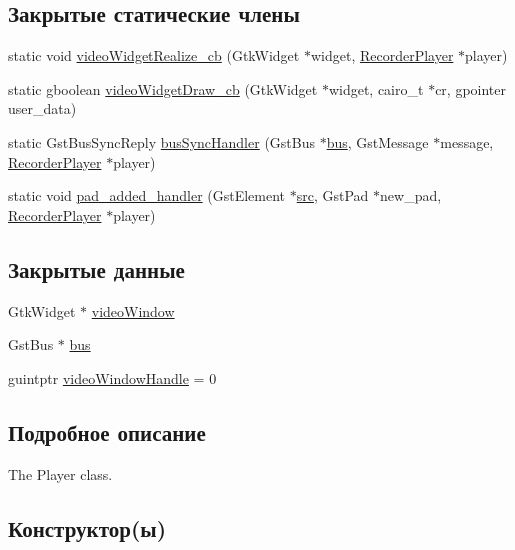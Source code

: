 \subsection*{Закрытые статические члены}
\begin{DoxyCompactItemize}
\item 
static void \hyperlink{class_recorder_player_adac1a9507b04011782c05557220ef7f2}{video\+Widget\+Realize\+\_\+cb} (Gtk\+Widget $\ast$widget, \hyperlink{class_recorder_player}{Recorder\+Player} $\ast$player)
\item 
static gboolean \hyperlink{class_recorder_player_ad1bf2b3712c21b8d5c24f01b23a5c854}{video\+Widget\+Draw\+\_\+cb} (Gtk\+Widget $\ast$widget, cairo\+\_\+t $\ast$cr, gpointer user\+\_\+data)
\item 
static Gst\+Bus\+Sync\+Reply \hyperlink{class_recorder_player_adb7a205e6752a5a88e23f5595508ad98}{bus\+Sync\+Handler} (Gst\+Bus $\ast$\hyperlink{class_recorder_player_a98cd2c8d5761cae28e518e529e5c310b}{bus}, Gst\+Message $\ast$message, \hyperlink{class_recorder_player}{Recorder\+Player} $\ast$player)
\item 
static void \hyperlink{class_recorder_player_adcdcc7aea5f2b7984b240f961dfcc8a9}{pad\+\_\+added\+\_\+handler} (Gst\+Element $\ast$\hyperlink{class_recorder_player_a9d7939305cd8972f5c14ba3faff82488}{src}, Gst\+Pad $\ast$new\+\_\+pad, \hyperlink{class_recorder_player}{Recorder\+Player} $\ast$player)
\end{DoxyCompactItemize}
\subsection*{Закрытые данные}
\begin{DoxyCompactItemize}
\item 
Gtk\+Widget $\ast$ \hyperlink{class_recorder_player_a88e14542c46c550d3366ce20c047dcef}{video\+Window}
\item 
Gst\+Bus $\ast$ \hyperlink{class_recorder_player_a98cd2c8d5761cae28e518e529e5c310b}{bus}
\item 
guintptr \hyperlink{class_recorder_player_a2c788aa6e0c30a8333198f859ce21955}{video\+Window\+Handle} = 0
\end{DoxyCompactItemize}


\subsection{Подробное описание}
The Player class. 

\subsection{Конструктор(ы)}
\mbox{\label{class_recorder_player_a12a01ff15528f155880500982849f800}} 
